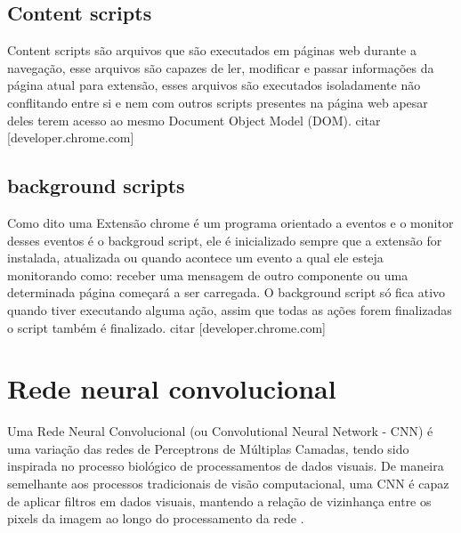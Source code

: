 \documentclass[conference]{IEEEtran}
\begin{document}
\subsection{Content scripts}\label{contentScripts} 
Content scripts são arquivos que são executados em páginas web durante a navegação, esse arquivos são capazes de ler, modificar e passar informações da página atual para extensão, esses arquivos são executados isoladamente não conflitando entre si e nem com outros scripts presentes na página web apesar deles terem acesso ao mesmo Document Object Model (DOM). citar [developer.chrome.com]

\subsection{background scripts}\label{backgroundScript} 
Como dito uma Extensão chrome é um programa orientado a eventos e o monitor desses eventos é o backgroud script, ele é inicializado sempre que a extensão for instalada, atualizada  ou quando acontece um evento a qual ele esteja monitorando como: receber uma mensagem de outro componente ou uma determinada página começará a ser carregada. O background script só fica ativo quando tiver executando alguma ação, assim que todas as ações forem finalizadas o script também
é finalizado. citar [developer.chrome.com]


\section{Rede neural convolucional}\label{cnn} 
Uma Rede Neural Convolucional (ou Convolutional Neural Network - CNN) é uma variação das redes de Perceptrons de Múltiplas Camadas, tendo sido inspirada no processo biológico de processamentos de dados visuais. De maneira semelhante aos processos tradicionais de visão computacional, uma CNN é capaz de aplicar filtros em dados visuais, mantendo a relação de vizinhança entre os pixels da imagem ao longo do processamento da rede \cite{vargas2016estudo}.
\end{document}
